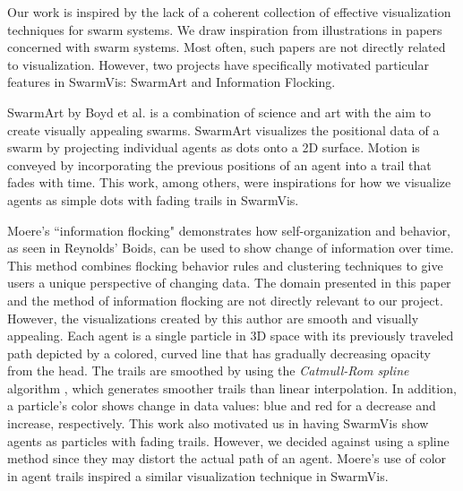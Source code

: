 \documentclass{vgtc}
\begin{document}
Our work is inspired by the lack of a coherent collection of effective visualization techniques for swarm systems.
We draw inspiration from illustrations in papers concerned with swarm systems. Most often, such papers are not directly related to visualization.
However, two projects have specifically motivated particular features in SwarmVis: SwarmArt\cite{Boyd} and
Information Flocking\cite{1382896}.

SwarmArt by Boyd et al. is a combination of science and art with the aim to create visually appealing swarms.
SwarmArt visualizes the positional data of a swarm by projecting individual agents as dots onto a 2D surface.
Motion is conveyed by incorporating the previous positions of an agent into a trail that fades with time.
This work, among others\cite{codeswarm:website}\cite{joshi2005iit},
were inspirations for how we visualize agents as simple dots with fading trails
in SwarmVis.

Moere's ``information flocking" demonstrates how self-organization and behavior,
as seen in Reynolds' Boids, can be used to show change of information over time\cite{1382896}.
This method combines flocking behavior rules
and clustering techniques to give users a unique perspective of changing data.
The domain presented in this paper and the method of information flocking are not directly relevant to our project.
However, the visualizations created by this author are smooth and visually appealing.
Each agent is a single particle in 3D space with its previously traveled path depicted by a colored,
curved line that has gradually decreasing opacity from the head.
The trails are smoothed by using the {\em Catmull-Rom spline} algorithm \cite{378511},
which generates smoother trails than linear interpolation.
In addition, a particle's color shows change in data values: blue and red for a decrease and increase, respectively.
This work also motivated us in having SwarmVis show agents as particles with fading trails.
However, we decided against using a spline method since they may distort the actual path of an agent.
Moere's use of color in agent trails inspired a similar visualization technique in SwarmVis.
\end{document}
